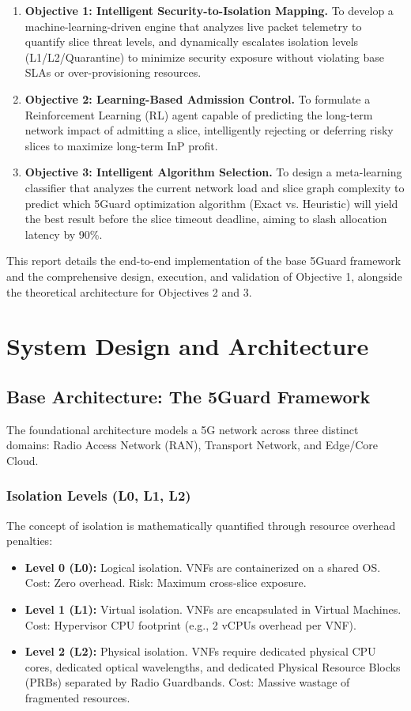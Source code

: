 \documentclass[12pt]{article}
\newcommand{\setchapterheader}[1]{%
  \fancyhead[L]{\textit{#1}}%
}
\begin{document}
\begin{enumerate}
    \item \textbf{Objective 1: Intelligent Security-to-Isolation Mapping.} To develop a machine-learning-driven engine that analyzes live packet telemetry to quantify slice threat levels, and dynamically escalates isolation levels (L1/L2/Quarantine) to minimize security exposure without violating base SLAs or over-provisioning resources.
    \item \textbf{Objective 2: Learning-Based Admission Control.} To formulate a Reinforcement Learning (RL) agent capable of predicting the long-term network impact of admitting a slice, intelligently rejecting or deferring risky slices to maximize long-term InP profit.
    \item \textbf{Objective 3: Intelligent Algorithm Selection.} To design a meta-learning classifier that analyzes the current network load and slice graph complexity to predict which 5Guard optimization algorithm (Exact vs. Heuristic) will yield the best result before the slice timeout deadline, aiming to slash allocation latency by 90\%.
\end{enumerate}

This report details the end-to-end implementation of the base 5Guard framework and the comprehensive design, execution, and validation of Objective 1, alongside the theoretical architecture for Objectives 2 and 3.
\clearpage
\setchapterheader{System Design and Architecture}
\section{System Design and Architecture}

\subsection{Base Architecture: The 5Guard Framework}
The foundational architecture models a 5G network across three distinct domains: Radio Access Network (RAN), Transport Network, and Edge/Core Cloud. 

\subsubsection{Isolation Levels (L0, L1, L2)}
The concept of isolation is mathematically quantified through resource overhead penalties:
\begin{itemize}
    \item \textbf{Level 0 (L0):} Logical isolation. VNFs are containerized on a shared OS. Cost: Zero overhead. Risk: Maximum cross-slice exposure.
    \item \textbf{Level 1 (L1):} Virtual isolation. VNFs are encapsulated in Virtual Machines. Cost: Hypervisor CPU footprint (e.g., 2 vCPUs overhead per VNF).
    \item \textbf{Level 2 (L2):} Physical isolation. VNFs require dedicated physical CPU cores, dedicated optical wavelengths, and dedicated Physical Resource Blocks (PRBs) separated by Radio Guardbands. Cost: Massive wastage of fragmented resources.
\end{itemize}
\end{document}
